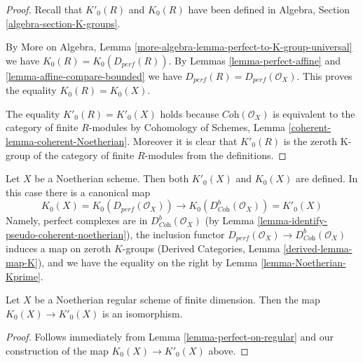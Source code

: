 \begin{proof}
Recall that $K'_0(R)$ and $K_0(R)$ have been defined in
Algebra, Section \ref{algebra-section-K-groups}.

\medskip\noindent
By More on Algebra, Lemma \ref{more-algebra-lemma-perfect-to-K-group-universal}
we have $K_0(R) = K_0(D_{perf}(R))$.
By Lemmas \ref{lemma-perfect-affine} and \ref{lemma-affine-compare-bounded}
we have $D_{perf}(R) = D_{perf}(\mathcal{O}_X)$.
This proves the equality $K_0(R) = K_0(X)$.

\medskip\noindent
The equality $K'_0(R) = K'_0(X)$ holds because
$\textit{Coh}(\mathcal{O}_X)$ is equivalent to the category
of finite $R$-modules by Cohomology of Schemes, Lemma
\ref{coherent-lemma-coherent-Noetherian}. Moreover it is
clear that $K'_0(R)$ is the zeroth K-group of the category
of finite $R$-modules from the definitions.
\end{proof}

\noindent
Let $X$ be a Noetherian scheme. Then both $K'_0(X)$ and $K_0(X)$
are defined. In this case there is a canonical map
$$
K_0(X) = K_0(D_{perf}(\mathcal{O}_X))
\longrightarrow
K_0(D^b_{\textit{Coh}}(\mathcal{O}_X)) = K'_0(X)
$$
Namely, perfect complexes are in $D^b_{\textit{Coh}}(\mathcal{O}_X)$
(by Lemma \ref{lemma-identify-pseudo-coherent-noetherian}), the inclusion
functor
$D_{perf}(\mathcal{O}_X) \to D^b_{\textit{Coh}}(\mathcal{O}_X)$
induces a map on zeroth $K$-groups
(Derived Categories, Lemma \ref{derived-lemma-map-K}),
and we have the equality on the right by
Lemma \ref{lemma-Noetherian-Kprime}.

\begin{lemma}
\label{lemma-Kprime-K}
Let $X$ be a Noetherian regular scheme of finite dimension. Then
the map $K_0(X) \to K'_0(X)$ is an isomorphism.
\end{lemma}

\begin{proof}
Follows immediately from Lemma \ref{lemma-perfect-on-regular}
and our construction of the map $K_0(X) \to K'_0(X)$ above.
\end{proof}


